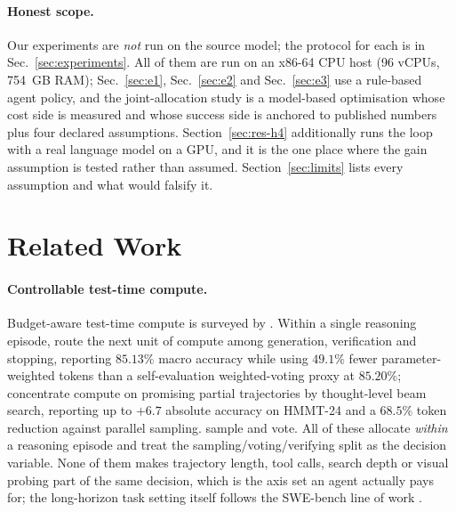 \documentclass[10pt]{article} %
\begin{document}
\paragraph{Honest scope.}
Our experiments are \emph{not} run on the source model; the protocol for each is in Sec.~\ref{sec:experiments}. All of them are run on an
x86-64 CPU host (96 vCPUs, 754~GB RAM); Sec.~\ref{sec:e1}, Sec.~\ref{sec:e2} and
Sec.~\ref{sec:e3} use a rule-based agent policy, and the joint-allocation study is
a model-based optimisation whose cost side is measured and whose success side is
anchored to published numbers plus four declared assumptions.
Section~\ref{sec:res-h4} additionally runs the loop with a real language model on
a GPU, and it is the one place where the gain assumption is tested rather than
assumed. Section~\ref{sec:limits} lists every assumption and what would
falsify it.

\section{Related Work}
\label{sec:related}

\paragraph{Controllable test-time compute.}
Budget-aware test-time compute is surveyed by \citet{alomrani2025reasoningbudget}.
Within a single reasoning episode, \citet{zhou2026coba} route the next unit of
compute among generation, verification and stopping, reporting $85.13\%$ macro
accuracy while using $49.1\%$ fewer parameter-weighted tokens than a
self-evaluation weighted-voting proxy at $85.20\%$; \citet{yang2026gambit}
concentrate compute on promising partial trajectories by thought-level beam
search, reporting up to $+6.7$ absolute accuracy on HMMT-24 and a $68.5\%$ token
reduction against parallel sampling. \citet{wang2023selfconsistency} sample and
vote. All of these allocate \emph{within} a reasoning episode and treat the
sampling/voting/verifying split as the decision variable. None of them makes
trajectory length, tool calls, search depth or visual probing part of the same
decision, which is the axis set an agent actually pays for; the long-horizon task setting itself follows the SWE-bench line of work \citep{jimenez2024swebench}.
\end{document}
